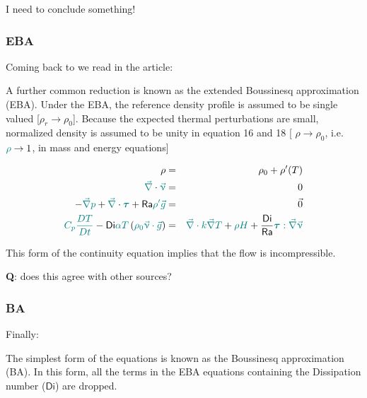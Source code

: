 \documentclass[a4paper,11pt]{article}
\newcommand{\nn}{\nonumber}
\newcommand{\Ranb}{{\mathsf{Ra}}}
\newcommand{\Dinb}{{\mathsf{Di}}}
\begin{document}
{\color{red} I need to conclude something!}


\subsubsection{EBA}

Coming back to \cite{itki94} we read in the article:
\begin{displayquote}  {\color{darkgray}
A further common reduction is known as the extended Boussinesq approximation (EBA).
Under the EBA, the reference density profile is assumed to be single valued 
[$\rho_r \rightarrow \rho_0$]. Because the expected thermal perturbations are small,
normalized density is assumed to be unity in equation 16 and 18 
[ $\rho \rightarrow \rho_0$, i.e. ${\color{teal} \rho} \rightarrow 1$, in mass and energy equations]}
\end{displayquote}

\begin{eqnarray}
\rho &=& \rho_0 + \rho'(T) \nn\\
{\color{teal} \vec\nabla } \cdot  {\color{teal}  \vec\upnu} &=& 0 \nn\\
-{\color{teal} \vec\nabla} {\color{teal}p} + {\color{teal} \vec\nabla} \cdot 
{\color{teal} {\bm \tau}}
+ \Ranb  {\color{teal} \rho' \vec{g}} &=&\vec{0} \nn\\
{\color{teal}  C_p \frac{DT}{Dt}} 
- \Dinb  {\color{teal} \alpha T } 
\left( 
{\color{teal} \rho_0 \vec\upnu \cdot \vec{g} }  \right)
&=&
{\color{teal} \vec\nabla \cdot k \vec\nabla T}
+
{\color{teal} \rho H }
+
\frac{\Dinb}{\Ranb} 
{\color{teal} {\bm \tau} : \vec\nabla \vec\upnu} 
\end{eqnarray}

This form of the continuity equation implies that the flow is incompressible. 

{\color{red} {\bf Q}: does this agree with other sources?}


\subsubsection{BA}

Finally:
\begin{displayquote}  {\color{darkgray}
The simplest form of the equations is known as the Boussinesq
approximation (BA). In this form, all the terms in the 
EBA equations containing the  Dissipation number ($\Dinb$) are dropped.}
\end{displayquote}
\end{document}
